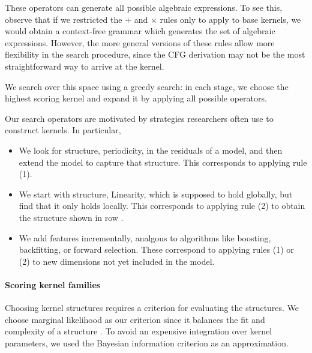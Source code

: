 \documentclass[twoside]{article}
\begin{document}
These operators can generate all possible algebraic expressions.
To see this, observe that if we restricted the $+$ and $\times$ rules only to apply to base kernels, we would obtain a context-free grammar which generates the set of algebraic expressions.
However, the more general versions of these rules allow more flexibility in the search procedure, since the CFG derivation may not be the most straightforward way to arrive at the kernel.

We search over this space using a greedy search: in each stage, we choose the highest scoring kernel and expand it by applying all possible operators.

Our search operators are motivated by strategies researchers often use to construct kernels.
In particular,
\begin{itemize}
\item We look for structure, \eg periodicity, in the residuals of a model, and then extend the model to capture that structure.
This corresponds to applying rule (1).
\item We start with structure, \eg Linearity, which is supposed to hold globally, but find that it only holds locally.
This corresponds to applying rule (2) to obtain the structure shown in row .
\item We add features incrementally, analgous to algorithms like boosting, backfitting, or forward selection.
These correspond to applying rules (1) or (2) to new dimensions not yet included in the model.
\end{itemize}

\paragraph{Scoring kernel families}

Choosing kernel structures requires a criterion for evaluating the structures.
We choose marginal likelihood as our criterion since it balances the fit and complexity of a structure \citep[e.g.][]{rasmussen2001occam}.
To avoid an expensive integration over kernel parameters, we used the Bayesian information criterion \citep{schwarz1978estimating} as an approximation.
\end{document}
